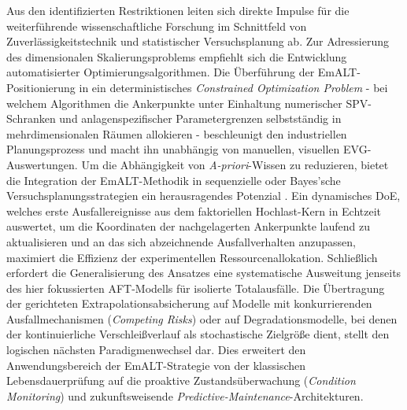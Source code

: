 Aus den identifizierten Restriktionen leiten sich direkte Impulse für die weiterführende wissenschaftliche Forschung im Schnittfeld von Zuverlässigkeitstechnik und statistischer Versuchsplanung ab.
Zur Adressierung des dimensionalen Skalierungsproblems empfiehlt sich die Entwicklung automatisierter Optimierungsalgorithmen.
Die Überführung der \ac{EmALT}-Positionierung in ein deterministisches \textit{Constrained Optimization Problem} - bei welchem Algorithmen die Ankerpunkte unter Einhaltung numerischer \ac{SPV}-Schranken und anlagenspezifischer Parametergrenzen selbstständig in mehrdimensionalen Räumen allokieren - beschleunigt den industriellen Planungsprozess und macht ihn unabhängig von manuellen, visuellen \ac{EVG}-Auswertungen.
Um die Abhängigkeit von \textit{A-priori}-Wissen zu reduzieren, bietet die Integration der \ac{EmALT}-Methodik in sequenzielle oder Bayes'sche Versuchsplanungsstrategien ein herausragendes Potenzial \cite{Rigdon.2022,Khuri.2006,Englert.2012}.
Ein dynamisches \ac{DoE}, welches erste Ausfallereignisse aus dem faktoriellen Hochlast-Kern in Echtzeit auswertet, um die Koordinaten der nachgelagerten Ankerpunkte laufend zu aktualisieren und an das sich abzeichnende Ausfallverhalten anzupassen, maximiert die Effizienz der experimentellen Ressourcenallokation.
Schließlich erfordert die Generalisierung des Ansatzes eine systematische Ausweitung jenseits des hier fokussierten \ac{AFT}-Modells für isolierte Totalausfälle.
Die Übertragung der gerichteten Extrapolationsabsicherung auf Modelle mit konkurrierenden Ausfallmechanismen (\textit{Competing Risks}) oder auf Degradationsmodelle, bei denen der kontinuierliche Verschleißverlauf als stochastische Zielgröße dient, stellt den logischen nächsten Paradigmenwechsel dar.
Dies erweitert den Anwendungsbereich der \ac{EmALT}-Strategie von der klassischen Lebensdauerprüfung auf die proaktive Zustandsüberwachung (\textit{Condition Monitoring}) und zukunftsweisende \textit{Predictive-Maintenance}-Architekturen.